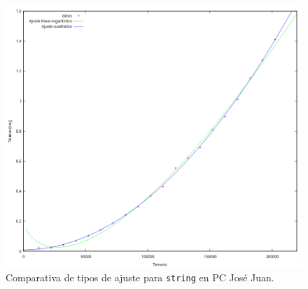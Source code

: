 \documentclass[12pt]{article}
\begin{document}
    \begin{figure}
        \centering
        \includegraphics[width=\linewidth]{images/quicksort/graficas/string/Comparativa-ajustes.png}
        \cprotect\caption{Comparativa de tipos de ajuste para \verb|string| en PC José Juan.}
        \label{fig:QuicksortComparativaString}
    \end{figure}
\end{document}
